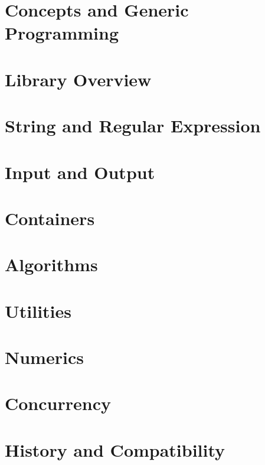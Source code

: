 \documentclass{article}
\begin{document}
\section{Concepts and Generic Programming}

\section{Library Overview}

\section{String and Regular Expression}

\section{Input and Output}

\section{Containers}

\section{Algorithms}

\section{Utilities}

\section{Numerics}

\section{Concurrency}

\section{History and Compatibility}
\end{document}
